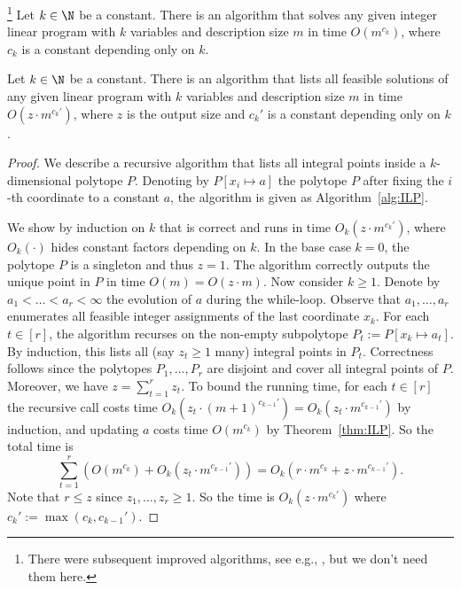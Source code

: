 %
\begin{theorem}\!\!\footnote{There were subsequent improved algorithms, see e.g., \cite{ReisR23}, but we don't need them here.}
    \label{thm:ILP}
    Let $k \in \N$ be a constant. There is an algorithm that solves any given integer linear program with $k$ variables and description size $m$ in time $O(m^{c_k})$, where $c_k$ is a constant depending only on $k$.
\end{theorem}
%
\begin{corollary}
    \label{cor:ILP}
    Let $k \in \N$ be a constant. There is an algorithm that lists all feasible solutions of any given linear program with $k$ variables and description size $m$ in time $O(z \cdot m^{c_k'})$, where $z$ is the output size and $c_k'$ is a constant depending only on $k$.
\end{corollary}
%
\begin{proof}
	We describe a recursive algorithm  that lists all integral points inside a $k$-dimensional polytope $P$. Denoting by $P[x_i \mapsto a]$ the polytope $P$ after fixing the $i$-th coordinate to a constant $a$, the algorithm is given as Algorithm~\ref{alg:ILP}.
%
	\begin{algorithm}[htbp]
        \caption{Listing all solutions in an ILP}
        \label{alg:ILP}
    \end{algorithm}
%
    We show by induction on $k$ that  is correct and runs in time $O_k(z \cdot m^{c_k'})$, where $O_k(\cdot)$ hides constant factors depending on $k$. In the base case $k = 0$, the polytope $P$ is a singleton and thus $z = 1$. The algorithm correctly outputs the unique point in $P$ in time $O(m) = O(z \cdot m)$.
%
    Now consider $k \geq 1$. Denote by $a_1 < \dots < a_r < \infty$ the evolution of $a$ during the while-loop. Observe that $a_1, \dots, a_r$ enumerates all feasible integer assignments of the last coordinate $x_k$. For each $t \in [r]$, the algorithm recurses on the non-empty subpolytope $P_t := P[x_k \mapsto a_t]$. By induction, this lists all (say $z_t \geq 1$ many) integral points in $P_t$. Correctness follows since the polytopes $P_1, \dots, P_r$ are disjoint and cover all integral points of $P$. Moreover, we have $z = \sum_{t=1}^r z_t$. To bound the running time, for each $t \in [r]$ the recursive call costs time $O_k(z_t \cdot (m+1)^{c_{k-1}'}) = O_k(z_t \cdot m^{c_{k-1}'})$ by induction, and updating $a$ costs time $O(m^{c_k})$ by Theorem~\ref{thm:ILP}. So the total time is
	\[ \sum_{t=1}^r \left( O(m^{c_k}) + O_k(z_t \cdot m^{c_{k-1}'}) \right) = O_k(r \cdot m^{c_k} + z \cdot m^{c_{k-1}'}). \]
	Note that $r \leq z$ since $z_1, \dots, z_r \geq 1$. So the time is $O_k(z \cdot m^{c_k'})$ where $c_k' := \max(c_k, c_{k-1}')$.
\end{proof}

